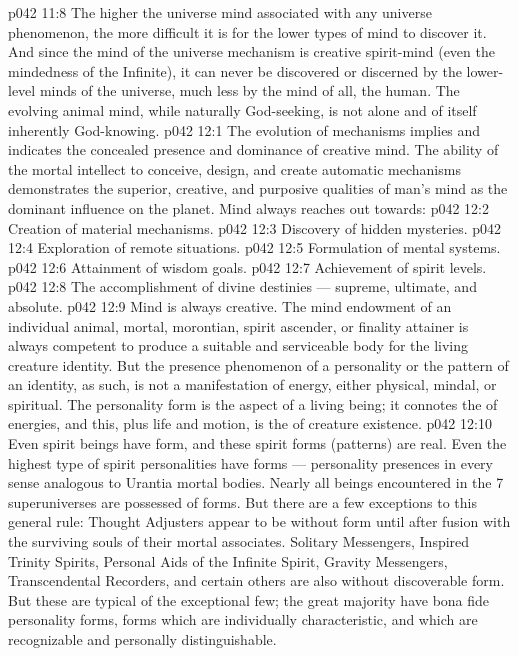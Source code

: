 \vs p042 11:8 The higher the universe mind associated with any universe phenomenon, the more difficult it is for the lower types of mind to discover it. And since the mind of the universe mechanism is creative spirit\hyp{}mind (even the mindedness of the Infinite), it can never be discovered or discerned by the lower\hyp{}level minds of the universe, much less by the  mind of all, the human. The evolving animal mind, while naturally God\hyp{}seeking, is not alone and of itself inherently God\hyp{}knowing.
\vs p042 12:1 The evolution of mechanisms implies and indicates the concealed presence and dominance of creative mind. The ability of the mortal intellect to conceive, design, and create automatic mechanisms demonstrates the superior, creative, and purposive qualities of man’s mind as the dominant influence on the planet. Mind always reaches out towards:
\vs p042 12:2 \bibnobreakspace Creation of material mechanisms.
\vs p042 12:3 \bibnobreakspace Discovery of hidden mysteries.
\vs p042 12:4 \bibnobreakspace Exploration of remote situations.
\vs p042 12:5 \bibnobreakspace Formulation of mental systems.
\vs p042 12:6 \bibnobreakspace Attainment of wisdom goals.
\vs p042 12:7 \bibnobreakspace Achievement of spirit levels.
\vs p042 12:8 \bibnobreakspace The accomplishment of divine destinies --- supreme, ultimate, and absolute.
\vs p042 12:9 \pc Mind is always creative. The mind endowment of an individual animal, mortal, morontian, spirit ascender, or finality attainer is always competent to produce a suitable and serviceable body for the living creature identity. But the presence phenomenon of a personality or the pattern of an identity, as such, is not a manifestation of energy, either physical, mindal, or spiritual. The personality form is the  aspect of a living being; it connotes the  of energies, and this, plus life and motion, is the  of creature existence.
\vs p042 12:10 Even spirit beings have form, and these spirit forms (patterns) are real. Even the highest type of spirit personalities have forms --- personality presences in every sense analogous to Urantia mortal bodies. Nearly all beings encountered in the 7 superuniverses are possessed of forms. But there are a few exceptions to this general rule: Thought Adjusters appear to be without form until after fusion with the surviving souls of their mortal associates. Solitary Messengers, Inspired Trinity Spirits, Personal Aids of the Infinite Spirit, Gravity Messengers, Transcendental Recorders, and certain others are also without discoverable form. But these are typical of the exceptional few; the great majority have bona fide personality forms, forms which are individually characteristic, and which are recognizable and personally distinguishable.
